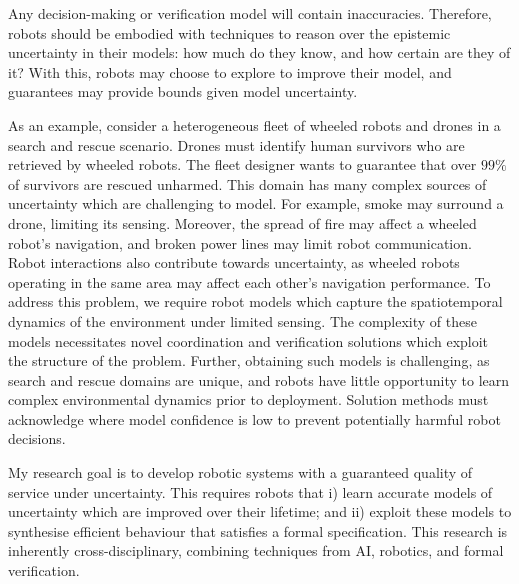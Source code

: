 \documentclass[11pt]{article}
\begin{document}

Any decision-making or verification model will contain inaccuracies.
%
Therefore, robots should be embodied with techniques to reason over the epistemic uncertainty in their models: how much do they know, and how certain are they of it?
%
With this, robots may choose to explore to improve their model, and guarantees may provide bounds given model uncertainty.

\fi

As an example, consider a heterogeneous fleet of wheeled robots and drones in a search and rescue scenario.
%
Drones must identify human survivors who are retrieved by wheeled robots.
%
The fleet designer wants to guarantee that over $99\%$ of survivors are rescued unharmed.
%
This domain has many complex sources of uncertainty which are challenging to model.
%
For example, smoke may surround a drone, limiting its sensing.
%
Moreover, the spread of fire may affect a wheeled robot's navigation, and broken power lines may limit robot communication. 
%
Robot interactions also contribute towards uncertainty, as wheeled robots operating in the same area may affect each other's navigation performance.
%
To address this problem, we require robot models which capture the spatiotemporal dynamics of the environment under limited sensing.
%
The complexity of these models necessitates novel coordination and verification solutions which exploit the structure of the problem.
%
Further, obtaining such models is challenging, as search and rescue domains are unique, and robots have little opportunity to learn complex environmental dynamics prior to deployment.
%
Solution methods must acknowledge where model confidence is low to prevent potentially harmful robot decisions.


My research goal is to develop robotic systems with a guaranteed quality of service under uncertainty.
%
This requires robots that i) learn accurate models of uncertainty which are improved over their lifetime; and ii) exploit these models to synthesise efficient behaviour that satisfies a formal specification.
%
This research is inherently cross-disciplinary, combining techniques from AI, robotics, and formal verification.
\end{document}
